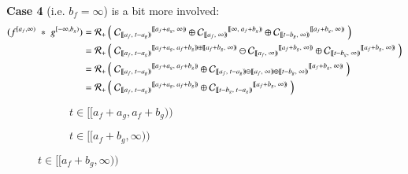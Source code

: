 \textbf{Case 4} (i.e. $b_f = \infty$) is a bit more involved:
\begin{align*}
	(f^{[a_f,\infty)} \;*\; g^{[-\infty,b_g)}) 
	= \R[+] &\left( \; 
			{\C[ [\![a_f,\;t-a_g)\!) ]}^{[\![a_f+a_g,\; \infty)\!)} \oplus
			{\C[ [\![a_f,\;\infty)\!) ]}^{[\![\infty,\; a_f+b_g)\!)} \oplus
			{\C[ [\![t-b_g,\;\infty)\!) ]}^{[\![a_f+b_g,\; \infty)\!)} 
		\; \right) \\
	= \R[+] &\left( \; 
			{\C[ [\![a_f,\;t-a_g)\!) ]}^{[\![a_f+a_g,\; a_f+b_g)\!) \oplus[\![a_f+b_g,\; \infty)\!)} \ominus
			{\C[ [\![a_f,\;\infty)\!) ]}^{[\![a_f+b_g,\; \infty)\!)} \oplus
			{\C[ [\![t-b_g,\;\infty)\!) ]}^{[\![a_f+b_g,\; \infty)\!)} 
		\; \right) \\
	= \R[+] &\left( \; 
			{\C[ [\![a_f,\;t-a_g)\!) ]}^{[\![a_f+a_g,\; a_f+b_g)\!)} \oplus
			{\C[ [\![a_f,\;t-a_g)\!) \ominus [\![a_f,\;\infty)\!) \oplus [\![t-b_g,\;\infty)\!)  ]}^{[\![a_f+b_g,\; \infty)\!)} 
		\; \right) \\
	= \R[+] &\left( \; 
			{\C[ [\![a_f,\;t-a_g)\!) ]}^{[\![a_f+a_g,\; a_f+b_g)\!)} \oplus
			{\C[ [\![t-b_g,\;t-a_g)\!)  ]}^{[\![a_f+b_g,\; \infty)\!)} 
		\; \right)
\end{align*}
\vspace{-1.5cm}
\begin{figure}[h]
	\centering
	\begin{subfigure}[h]{0.4\textwidth}
		\caption{$t \in [\![a_f+a_g, a_f+b_g)\!)$} 
		\centering
	\end{subfigure}
	\begin{subfigure}[h]{0.4\textwidth}
		\caption{$t \in [\![a_f+b_g, \infty)\!)$} 
		\centering
	\end{subfigure}
\end{figure}

